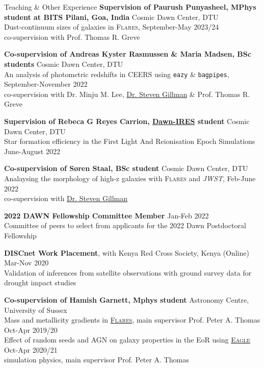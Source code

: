 \documentclass[a4paper,10pt]{resume} %
\begin{document}
\begin{rSection}{Teaching \& Other Experience}
{\bf Supervision of Paurush Punyasheel, MPhys student at BITS Pilani, Goa, India} \hfill {Cosmic Dawn Center, DTU}	
\\
{Dust-continuum sizes of galaxies in \textsc{Flares},}	\hfill {September-May 2023/24}
\\
{co-supervision with Prof. Thomas R. Greve}

{\bf Co-supervision of Andreas Kyster Rasmussen \& Maria Madsen, BSc students} \hfill {Cosmic Dawn Center, DTU}	
\\
{An analysis of photometric redshifts in CEERS using \texttt{eazy} \& \texttt{bagpipes},}	\hfill {September-November 2022}
\\
{co-supervision with Dr. Minju M. Lee, \href{https://stevengillman.github.io/}{Dr. Steven Gillman} \& Prof. Thomas R. Greve}

{\bf Supervision of Rebeca G Reyes Carrion, \href{https://www.dawnires.com/}{Dawn-IRES} student} \hfill {Cosmic Dawn Center, DTU}
\\
{Star formation efficiency in the First Light And Reionisation Epoch Simulations} \hfill {June-August 2022}

{\bf Co-supervision of S{\o}ren Staal, BSc student} \hfill {Cosmic Dawn Center, DTU}
\\
{Analaysing the morphology of high-z galaxies with \textsc{Flares} and \textit{JWST},} \hfill  {Feb-June 2022}
\\
{co-supervision with \href{https://stevengillman.github.io/}{Dr. Steven Gillman}}

{\textbf{2022 DAWN Fellowship Committee Member}} \hfill  {Jan-Feb 2022}
\\
{Committee of peers to select from applicants for the 2022 Dawn Postdoctoral Fellowship}

{\textbf{DISCnet Work Placement}, with Kenya Red Cross Society, Kenya (Online)} \hfill {Mar-Nov 2020}
\\
{Validation of inferences from satellite observations with ground survey data for drought impact studies}

{\bf Co-supervision of Hamish Garnett, Mphys student} \hfill {Astronomy Centre, University of Sussex}
\\
{Mass and metallicity gradients in \href{https://flaresimulations.github.io/}{\textsc{Flares}}, main supervisor Prof. Peter A. Thomas} \hfill {Oct-Apr 2019/20}
\\
{Effect of random seeds and AGN on galaxy properties in the EoR using \href{https://eagle.strw.leidenuniv.nl/}{\textsc{Eagle}}} \hfill {Oct-Apr 2020/21} 
\\
{simulation physics, main supervisor Prof. Peter A. Thomas} 


\end{rSection}
\end{document}
